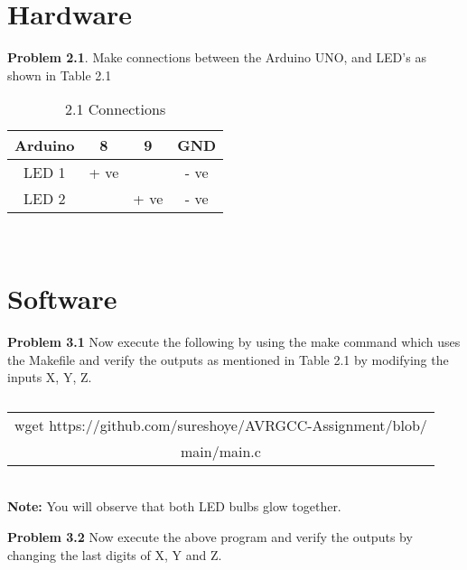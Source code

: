 \documentclass[journal,12pt,twocolumn]{IEEEtran}
\begin{document}
\section{Hardware}


\textbf{Problem 2.1}. Make connections between the Arduino UNO, and LED's as shown in Table 2.1 \\

\begin{table}[h]
    \centering
    \begin{tabular}{| c | c | c | c |}
        \hline
         Arduino & 8 & 9 & GND  \\
       \hline
       LED 1 & + ve &  & - ve  \\
        \hline
      LED 2 &  & + ve & - ve  \\
        \hline
         
    \end{tabular}
    \caption{2.1 Connections}
    \label{tab:my_label}
\end{table}
\\


\section{Software}

\textbf{Problem 3.1} Now execute the following  by using the make command which uses the Makefile and verify the outputs as mentioned in Table 2.1 by modifying the inputs X, Y, Z.\\
\begin{table}[h]
    \centering
    \begin{tabular}{| c |}
    \hline
    wget https://github.com/sureshoye/AVRGCC-Assignment/blob/\\main/main.c\\
    \hline
    \end{tabular}
    \caption{}
    \label{}
 \end{table}
 \\
\textbf{Note:} You will observe that both LED bulbs glow together.

\textbf{Problem 3.2} Now execute the above program and verify the outputs by changing the last digits of X, Y and Z.\\
\end{document}
